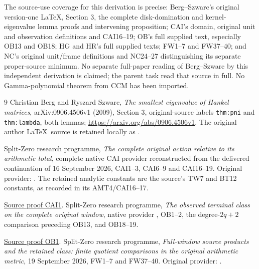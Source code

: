 \documentclass[11pt]{article}
\begin{document}
The source-use coverage for this derivation is precise: Berg--Szwarc's
original version-one \LaTeX, Section 3, the complete disk-domination
and kernel-eigenvalue lemma proofs and intervening proposition; CAI's
domain, original unit and observation definitions and CAI16--19;
OB's full supplied text, especially OB13 and OB18; HG and HR's full
supplied texts; FW1--7 and FW37--40; and NC's original unit/frame
definitions and NC24--27 distinguishing its separate proper-source
minimum.  No separate full-paper reading of Berg--Szwarc by this
independent derivation is claimed; the parent task read that source in
full.  No Gamma-polynomial theorem from CCM has been imported.

\begin{thebibliography}{9}
Christian Berg and Ryszard Szwarc,
\emph{The smallest eigenvalue of Hankel matrices},
arXiv:0906.4506v1 (2009), Section 3, original-source labels
\texttt{thm:pni} and \texttt{thm:lambda}, both lemmas;
\url{https://arxiv.org/abs/0906.4506v1}.
The original author \LaTeX\ source is retained locally as
.

Split-Zero research programme,
\emph{The complete original action relative to its arithmetic total},
complete native CAI provider reconstructed from the delivered continuation
of 16 September 2026, CAI1--3, CAI6--9 and CAI16--19.
Original provider: .
The retained analytic constants are the source's TW7 and BT12 constants,
as recorded in its AMT4/CAI16--17.


\href{https://github.com/KokunoYumeto/zeta-function-research-reader/blob/487253b5b01851da5b9b98af4e146fecf1fab902/workbenches/splitzero-tandem/continuations/20260919-full-window-source-products/providers/CAI_COMPLETE_PREREQUISITE.tex\#L46}{Source proof CAI1}.
Split-Zero research programme,
\emph{The observed terminal class on the complete original window},
native provider , OB1--2,
the degree-$2q+2$ comparison preceding OB13, and OB18--19.


\href{https://github.com/KokunoYumeto/zeta-function-research-reader/blob/5992ad50c0f2a06921f1fcaded7b4e38097c0739/workbenches/splitzero-tandem/continuations/20260920-original-kernel-mixed-determinants/providers/OBSERVED_CLASS_RETURN.tex\#L13}{Source proof OB1}.
Split-Zero research programme,
\emph{Full-window source products and the retained class:
finite quotient comparisons in the original arithmetic metric},
19 September 2026, FW1--7 and FW37--40.
Original provider: .



\end{thebibliography}
\end{document}
